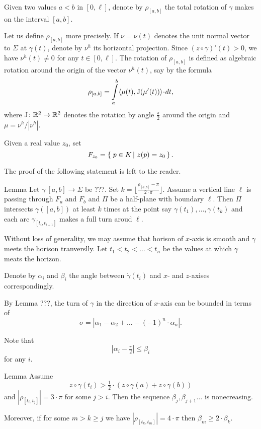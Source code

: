 \documentclass[a4paper,10pt]{amsart}
\begin{document}
Given two values $a<b$ in $[0,\ell]$,
denote by $\rho_{[a,b]}$ the total rotation of $\gamma$ makes on the interval $[a,b]$.

Let us define $\rho_{[a,b]}$ more precisely.
If $\nu=\nu(t)$ denotes the unit normal vector to $\Sigma$ at $\gamma(t)$,
denote by $\nu^h$ its horizontal projection.
Since $(z\circ\gamma)'(t)>0$, 
we have $\nu^h(t)\ne0$ for any $t\in [0,\ell]$.
The rotation of $\rho_{[a,b]}$  is defined as
algebraic rotation around the origin of the vector $\nu^h(t)$, 
say by the formula 
\[\rho_{[a,b]}
=
\int\limits_a^b \<\mu(t),\mathrm{J}(\mu'(t))\>\cdot dt,\]
where $\mathrm{J}\colon\mathbb{R}^2\to\mathbb{R}^2$ denotes the rotation by angle $\tfrac\pi 2$ around the origin and $\mu=\nu^h/|\nu^h|$.

Given a real value $z_0$, set 
\[F_{z_0}=\set{p\in K}{z(p)=z_0}.\]

The proof of the following statement is left to the reader.

\begin{thm}{Lemma}
Let $\gamma\:[a,b]\to\Sigma$ be ???.
Set $k=\lfloor \tfrac{\rho_{[a,b]}-\pi}{2\cdot\pi}\rfloor$.
Assume a vertical line $\ell$ is passing through $F_a$ and $F_b$
and $\Pi$ be a half-plane with boundary $\ell$.
Then $\Pi$
intersects $\gamma([a,b])$ at least $k$ times
at the point say $\gamma(t_1), \dots,\gamma(t_k)$
and each arc $\gamma_{[t_i,t_{i+1}]}$ makes a full turn aroud $\ell$.
\end{thm}

Without loss of generality, we may assume that horison of $x$-axis is smooth and $\gamma$ meets the horison tranverslly.
Let $t_1<t_2<\dots<t_n$
be the values at which $\gamma$ meats the horizon.

Denote by $\alpha_i$ and $\beta_i$
the angle between $\dot\gamma(t_i)$ and $x$- and $z$-axises correspondingly.

By Lemma ???, the turn of $\gamma$ in the direction of $x$-axis
can be bounded in terms of 
\[\sigma=|\alpha_1-\alpha_2+\dots-(-1)^n\cdot\alpha_n|.\]

Note that 
\[|\alpha_i-\tfrac\pi2|\le \beta_i\]
for any $i$.



\begin{thm}{Lemma}
Assume \[z\circ\gamma(t_i)>\tfrac12\cdot(z\circ\gamma(a)+z\circ\gamma(b))\]
and $|\rho_{[t_i,t_j]}|=3\cdot \pi$ for some $j>i$.
Then the sequence $\beta_j,\beta_{j+1}\dots$ is nonecreasing.

Moreover, if for some $m>k\ge j$ we have $|\rho_{[t_k,t_m]}|=4\cdot \pi$ then 
$\beta_m\ge 2\cdot \beta_k$.
\end{thm}
\end{document}
